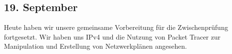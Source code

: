 \subsection{19. September}
Heute haben wir unsere gemeinsame Vorbereitung für die Zwischenprüfung fortgesetzt. Wir haben uns IPv4 und die Nutzung von Packet Tracer zur Manipulation und Erstellung von Netzwerkplänen angesehen.